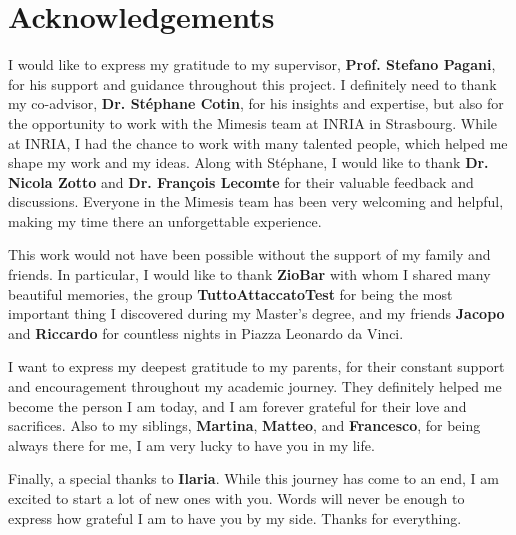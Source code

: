 \section*{Acknowledgements}
I would like to express my gratitude to my supervisor, \textbf{Prof. Stefano Pagani}, for his support and guidance throughout this project. I definitely need to thank my co-advisor, \textbf{Dr. Stéphane Cotin}, for his insights and expertise, but also for the opportunity to work with the Mimesis team at INRIA in Strasbourg. While at INRIA, I had the chance to work with many talented people, which helped me shape my work and my ideas. Along with Stéphane, I would like to thank \textbf{Dr. Nicola Zotto} and \textbf{Dr. François Lecomte} for their valuable feedback and discussions. Everyone in the Mimesis team has been very welcoming and helpful, making my time there an unforgettable experience. 

This work would not have been possible without the support of my family and friends. In particular, I would like to thank \textbf{ZioBar} with whom I shared many beautiful memories, the group \textbf{TuttoAttaccatoTest} for being the most important thing I discovered during my Master's degree, and my friends \textbf{Jacopo} and \textbf{Riccardo} for countless nights in Piazza Leonardo da Vinci.

I want to express my deepest gratitude to my parents, for their constant support and encouragement throughout my academic journey. They definitely helped me become the person I am today, and I am forever grateful for their love and sacrifices. Also to my siblings, \textbf{Martina}, \textbf{Matteo}, and \textbf{Francesco}, for being always there for me, I am very lucky to have you in my life.

Finally, a special thanks to \textbf{Ilaria}. While this journey has come to an end, I am excited to start a lot of new ones with you. Words will never be enough to express how grateful I am to have you by my side. Thanks for everything.